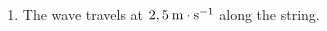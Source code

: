 {\begin{mdframed}[linewidth=4, leftmargin=40, rightmargin=40]
\begin{exercise}
\begin{enumerate}[noitemsep, label=\textbf{Step} \textbf{\arabic*}. ]
    \begin{equation}
    \begin{array}{ccc}\hfill v& =& f\ensuremath{\cdot}\lambda \hfill \\ & =& \left(10\phantom{\rule{0.277778em}{0ex}}\mathrm{Hz}\right)\left(0,25\phantom{\rule{0.166667em}{0ex}}\mathrm{m}\right)\hfill \\ & =& 2,5\phantom{\rule{0.166667em}{0ex}}\mathrm{m}\ensuremath{\cdot}{\mathrm{s}}^{-1}\hfill \end{array}\tag{7.11}
      \end{equation}
        \item  
        \label{m38806*id320240}The wave travels at $2,5\phantom{\rule{2pt}{0ex}}\mathrm{m}\ensuremath{\cdot}\mathrm{s}{}^{-1}$ along the string.
 \par 
        \end{enumerate}
    \end{exercise}
    \end{mdframed}
    }
    \noindent
\label{m38806*secfhsst!!!underscore!!!id804}\vspace{.5cm} 
      \noindent
